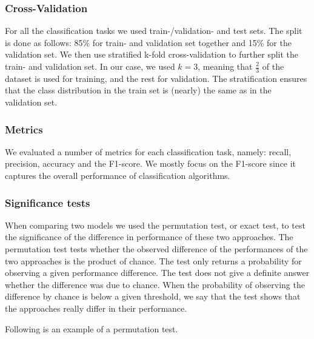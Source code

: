 \subsubsection{Cross-Validation}
For all the classification tasks we used train-/validation- and test sets.
The split is done as follows: 85\% for train- and validation set together and 15\% for the validation set.
We then use stratified k-fold cross-validation to further split the train- and validation set. In our case, we used $k = 3$, meaning that $\frac{2}{3}$ of the dataset is used for training, and the rest for validation.
The stratification ensures that the class distribution in the train set is (nearly) the same as in the validation set.


\subsubsection{Metrics}
We evaluated a number of metrics for each classification task, namely: 
recall, precision, accuracy and the F1-score. We mostly focus on the F1-score since it captures the overall performance of classification algorithms.

\subsubsection{Significance tests}
When comparing two models we used the permutation test, or exact test, to test the significance of the difference in performance of these two approaches.
The permutation test tests whether the observed difference of the performances of the two approaches is the product of chance.
The test only returns a probability for observing a given performance difference. The test does not give a definite answer whether the difference was due to chance.
When the probability of observing the difference by chance is below a given threshold, we say that the test shows that the approaches really differ in their performance.

Following is an example of a permutation test.

